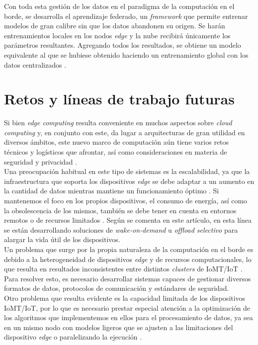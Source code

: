 \documentclass[twoside, 12pt]{opticajnl}
\begin{document}
Con toda esta gestión de los datos en el paradigma de la computación en el borde, se desarrolla el aprendizaje federado, un \textit{framework} que permite entrenar modelos de gran calibre sin que los datos abandonen su origen. Se harán entrenamientos locales en los nodos \textit{edge} y la nube recibirá únicamente los parámetros resultantes. Agregando todos los resultados, se obtiene un modelo equivalente al que se hubiese obtenido haciendo un entrenamiento global con los datos centralizados . 

\section{Retos y líneas de trabajo futuras}

Si bien \textit{edge computing} resulta conveniente en muchos aspectos sobre \textit{cloud computing} y, en conjunto con este, da lugar a arquitecturas de gran utilidad en diversos ámbitos, este nuevo marco de computación aún tiene varios retos técnicos y logísticos que afrontar, así como consideraciones en materia de seguridad y privacidad . \\

Una preocupación habitual en este tipo de sistemas es la escalabilidad, ya que la infraestructura que soporta los dispositivos \textit{edge} se debe adaptar a un aumento en la cantidad de datos mientras mantiene un funcionamiento óptimo . Si mantenemos el foco en los propios dispositivos, el consumo de energía, así como la obsolescencia de los mismos, también se debe tener en cuenta en entornos remotos o de recursos limitados . Según se comenta en este artículo, en esta línea se están desarrollando soluciones de \textit{wake‑on‑demand} u \textit{offload selectivo} para alargar la vida útil de los dispositivos. \\

Un problema que surge por la propia naturaleza de la computación en el borde es debido a la heterogeneidad de dispositivos \textit{edge} y de recursos computacionales, lo que resulta en resultados inconsistentes entre distintos \textit{clusters} de IoMT/IoT . Para resolver esto, es necesario desarrollar sistemas capaces de gestionar diversos formatos de datos, protocolos de comunicación y estándares de seguridad. \\

Otro problema que resulta evidente es la capacidad limitada de los dispositivos IoMT/IoT, por lo que es necesario prestar especial atención a la optimización de los algoritmos que implementemos en ellos para el procesamiento de datos, ya sea en un mismo nodo con modelos ligeros que se ajusten a las limitaciones del dispositivo \textit{edge}  o paralelizando la ejecución . \\
\end{document}
